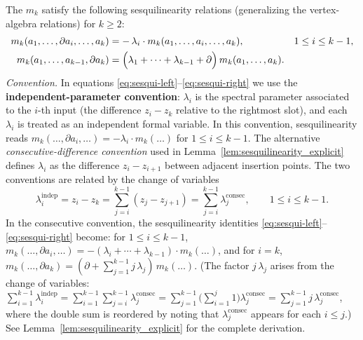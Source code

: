 \begin{definition}
\label{def:sesquilinearity}
The $m_k$ satisfy the following sesquilinearity relations (generalizing the vertex-algebra relations) for $k\ge 2$:
\begin{align}
\label{eq:sesqui-left}
m_k(a_1,\dots,\partial a_i,\dots,a_k)
&= -\,\lambda_i\cdot m_k(a_1,\dots,a_i,\dots,a_k), && 1\le i\le k-1,\\
\label{eq:sesqui-right}
m_k(a_1,\dots,a_{k-1},\partial a_k)
&= \Bigl(\lambda_1+\cdots+\lambda_{k-1}+\partial\Bigr)\, m_k(a_1,\dots,a_k).
\end{align}
\noindent
\emph{Convention.}\; In equations \eqref{eq:sesqui-left}--\eqref{eq:sesqui-right} we use the
\textbf{independent-parameter convention}: $\lambda_i$ is the spectral parameter
associated to the $i$-th input (the difference $z_i - z_k$ relative to the
rightmost slot), and each $\lambda_i$ is treated as an independent formal
variable. In this convention, sesquilinearity reads
$m_k(\ldots,\partial a_i,\ldots) = -\lambda_i\cdot m_k(\ldots)$ for
$1\le i\le k-1$. The alternative \emph{consecutive-difference convention}
used in Lemma~\ref{lem:sesquilinearity_explicit} defines $\lambda_i$ as the
difference $z_i - z_{i+1}$ between adjacent insertion points.
The two conventions are related by the change of variables
\begin{equation}\label{eq:indep-to-consec}
 \lambda_i^{\mathrm{indep}} = z_i - z_k
 = \sum_{j=i}^{k-1} (z_j - z_{j+1})
 = \sum_{j=i}^{k-1} \lambda_j^{\mathrm{consec}},
 \qquad 1\le i\le k-1.
\end{equation}
In the consecutive convention, the sesquilinearity identities
\eqref{eq:sesqui-left}--\eqref{eq:sesqui-right} become: for
$1\le i\le k-1$,
$m_k(\ldots,\partial a_i,\ldots) = -(\lambda_i+\cdots+\lambda_{k-1})
\cdot m_k(\ldots)$, and for $i=k$,
$m_k(\ldots,\partial a_k) = (\partial + \sum_{j=1}^{k-1} j\,\lambda_j)
\,m_k(\ldots)$.
(The factor $j\,\lambda_j$ arises from the change of variables: $\sum_{i=1}^{k-1}\lambda_i^{\mathrm{indep}} = \sum_{i=1}^{k-1}\sum_{j=i}^{k-1}\lambda_j^{\mathrm{consec}} = \sum_{j=1}^{k-1}\bigl(\sum_{i=1}^{j}1\bigr)\lambda_j^{\mathrm{consec}} = \sum_{j=1}^{k-1}j\,\lambda_j^{\mathrm{consec}}$, where the double sum is reordered by noting that $\lambda_j^{\mathrm{consec}}$ appears for each $i\le j$.)
See Lemma~\ref{lem:sesquilinearity_explicit} for the complete derivation.


\end{definition}
